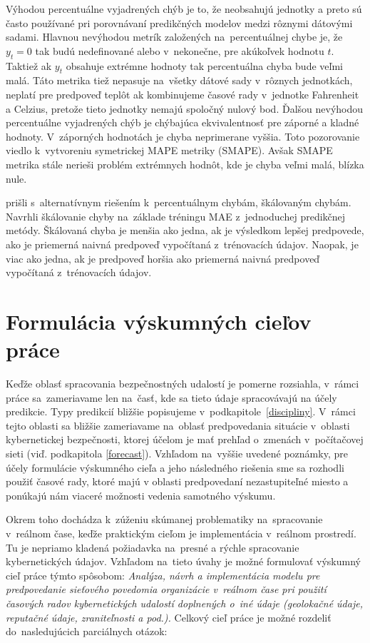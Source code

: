 \documentclass[thesismargins, thesislinespacing, openright, upjsfrontpage]{rnthesis}
\begin{document}
Výhodou percentuálne vyjadrených chýb je to, že neobsahujú jednotky a preto sú často používané pri porovnávaní predikčných modelov medzi rôznymi dátovými sadami. Hlavnou nevýhodou metrík založených na~percentuálnej chybe je, že $y_{t} = 0$ tak budú nedefinované alebo v~nekonečne, pre akúkoľvek hodnotu $t$. Taktiež ak $y_{t}$ obsahuje extrémne hodnoty tak percentuálna chyba bude veľmi malá. Táto metrika tiež nepasuje na~všetky dátové sady v~rôznych jednotkách, neplatí pre predpoveď teplôt ak kombinujeme časové rady v~jednotke Fahrenheit a Celzius, pretože tieto jednotky nemajú spoločný nulový bod. Ďalšou nevýhodou percentuálne vyjadrených chýb je chýbajúca ekvivalentnosť pre záporné a kladné hodnoty. V~záporných hodnotách je chyba neprimerane vyššia. Toto pozorovanie viedlo k~vytvoreniu symetrickej MAPE metriky \cite{armstrong1985crystal} (SMAPE). Avšak SMAPE metrika stále nerieši problém extrémnych hodnôt, kde je chyba veľmi malá, blízka nule. 

\cite{hyndman2006another} prišli s~alternatívnym riešením k~percentuálnym chybám, škálovaným chybám. Navrhli škálovanie chyby na~základe tréningu MAE z~jednoduchej predikčnej metódy. Škálovaná chyba je menšia ako jedna, ak je výsledkom lepšej predpovede, ako je priemerná naivná predpoveď vypočítaná z~trénovacích údajov. Naopak, je viac ako jedna, ak je predpoveď horšia ako priemerná naivná predpoveď vypočítaná z~trénovacích údajov.

\section{Formulácia výskumných cieľov práce}

Keďže oblasť spracovania bezpečnostných udalostí je pomerne rozsiahla, v~rámci práce sa~zameriavame len na~časť, kde sa tieto údaje spracovávajú na účely predikcie. Typy predikcií bližšie popisujeme v~podkapitole~\ref{discipliny}. V~rámci tejto oblasti sa bližšie zameriavame na~oblasť predpovedania situácie v~oblasti kybernetickej bezpečnosti, ktorej účelom je mať prehľad o~zmenách v~počítačovej sieti (viď. podkapitola \ref{forecast}). Vzhľadom na~vyššie uvedené poznámky, pre účely formulácie výskumného cieľa a jeho následného riešenia sme sa rozhodli použiť časové rady, ktoré majú v oblasti predpovedaní nezastupiteľné miesto a ponúkajú nám viaceré možnosti vedenia samotného výskumu. 

Okrem toho dochádza k~zúženiu skúmanej problematiky na~spracovanie v~reálnom čase, keďže praktickým cieľom je implementácia v~reálnom prostredí. Tu je nepriamo kladená požiadavka na~presné a rýchle spracovanie kybernetických údajov. Vzhľadom na~tieto úvahy je možné formulovať výskumný cieľ práce týmto spôsobom: \textit{Analýza, návrh a implementácia modelu pre predpovedanie sieťového povedomia organizácie v~reálnom čase pri použití časových radov kybernetických udalostí doplnených o~iné údaje (geolokačné údaje, reputačné údaje, zraniteľnosti a pod.).} Celkový cieľ práce je možné rozdeliť do~nasledujúcich parciálnych otázok:
\end{document}
